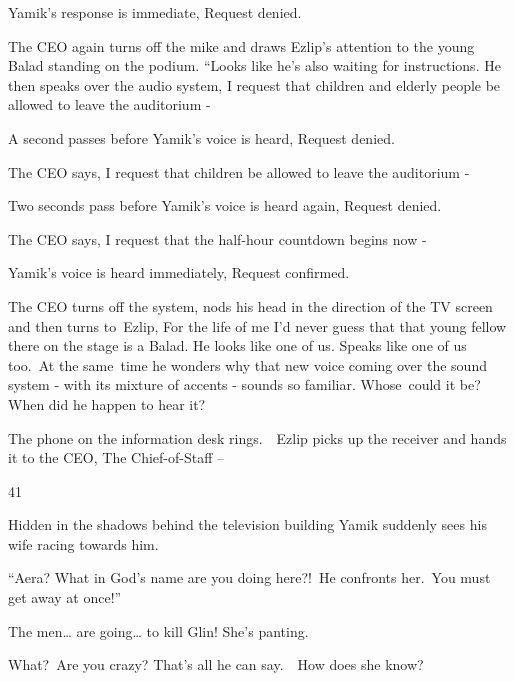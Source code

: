 \documentclass[letterpaper]{article}
\begin{document}
Yamik's response is immediate, {\textquotedbl}Request denied.{\textquotedbl}

The CEO again turns off the mike and draws Ezlip's attention to the young Balad standing on the podium. ``Looks like
he's also waiting for instructions.{\textquotedbl} He then speaks over the audio system, {\textquotedbl}I request that
children and elderly people be allowed to leave the auditorium -{\textquotedbl}

A second passes before Yamik's voice is heard, {\textquotedbl}Request denied.{\textquotedbl}

The CEO says, {\textquotedbl}I request that children be allowed to leave the auditorium -{\textquotedbl}

Two seconds pass before Yamik's voice is heard again, {\textquotedbl}Request denied.{\textquotedbl}

The CEO says, {\textquotedbl}I request that the half{}-hour countdown begins now -{\textquotedbl}

Yamik's voice is heard immediately, {\textquotedbl}Request confirmed.{\textquotedbl}

The CEO turns off the system, nods his head in the direction of the TV screen and then turns
to\textcolor[rgb]{0.0,0.4392157,0.7529412}{\ }Ezlip, {\textquotedbl}For the life of me I'd never guess that that young
fellow there on the stage is a Balad. He looks like one of us. Speaks like one of us too.{\textquotedbl}\ At the
same\ time he wonders why that new voice coming over the sound system - with its mixture of accents - sounds so
familiar. Whose\textcolor{red}{\ }could it be? When did he happen to hear it?

The phone on the information desk rings.\ \ Ezlip picks up the receiver and hands it to the CEO, {\textquotedbl}The
Chief-of-Staff --{\textquotedbl}


\bigskip

41\ 

Hidden in the shadows behind the television building Yamik suddenly sees his wife racing towards him. 

{}``Aera? What in God's name are you doing here?!{\textquotedbl}\ He confronts her.\ {\textquotedbl}You must get away at
once!''\ 

{\textquotedbl}The men{\dots} are going{\dots} to kill Glin!{\textquotedbl} She{}'s panting.

{\textquotedbl}What?\textcolor[rgb]{0.0,0.4392157,0.7529412}{\ }Are you crazy?{\textquotedbl} That's all he can
say.\ \ How does she know? 
\end{document}
